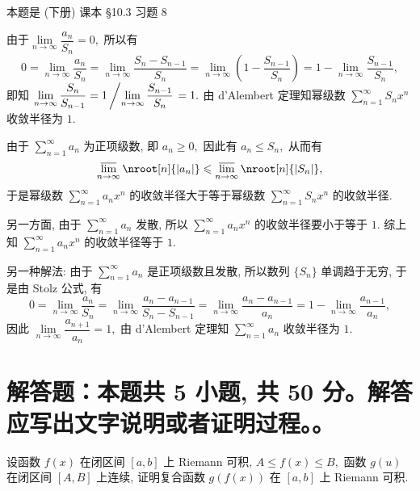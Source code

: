 \begin{solution}
本题是 (下册) 课本 \S 10.3 习题 8

由于$\lim\limits_{n\to\infty} \dfrac{a_n}{S_n} = 0,$ 所以有
\[0 = \lim\limits_{n\to\infty} \dfrac{a_n}{S_n} = \lim\limits_{n\to\infty} \dfrac{S_n - S_{n-1}}{S_n} = \lim\limits_{n\to\infty} \left( 1 - \dfrac{S_{n-1}}{S_n} \right) = 1 - \lim\limits_{n\to\infty} \dfrac{S_{n-1}}{S_n},\]
即知 $\lim\limits_{n\to\infty} \dfrac{S_n}{S_{n-1}} = 1 \left/ \lim\limits_{n\to\infty} \dfrac{S_{n-1}}{S_n} \right. = 1.$ 由 d'Alembert 定理知幂级数 $\sum\limits_{n=1}^{\infty} S_n x^n$ 收敛半径为 $1.$

由于 $\sum\limits_{n=1}^{\infty} a_n$ 为正项级数, 即 $a_n \geqslant 0,$ 因此有 $a_n \leqslant S_n,$ 从而有
\[\varlimsup_{n\to\infty} \nroot[n]{\lvert a_n \rvert} \leqslant \varlimsup_{n\to\infty} \nroot[n]{\lvert S_n \rvert},\]
于是幂级数 $\sum\limits_{n=1}^{\infty} a_n x^n$ 的收敛半径大于等于幂级数 $\sum\limits_{n=1}^{\infty} S_n x^n$ 的收敛半径.

另一方面, 由于 $\sum\limits_{n=1}^{\infty} a_n$ 发散, 所以 $\sum\limits_{n=1}^{\infty} a_n x^n$ 的收敛半径要小于等于 $1.$ 综上知 $\sum\limits_{n=1}^{\infty} a_n x^n$ 的收敛半径等于 $1.$

另一种解法: 由于 $\sum\limits_{n=1}^{\infty} a_n$ 是正项级数且发散, 所以数列 $\{S_n\}$ 单调趋于无穷, 于是由 Stolz 公式, 有
\[0 = \lim\limits_{n\to\infty} \dfrac{a_n}{S_n} = \lim\limits_{n\to\infty} \dfrac{a_n-a_{n-1}}{S_n-S_{n-1}} = \lim\limits_{n\to\infty} \dfrac{a_n-a_{n-1}}{a_n} = 1 -\lim\limits_{n\to\infty} \dfrac{a_{n-1}}{a_n},\]
因此 $\lim\limits_{n\to\infty} \dfrac{a_{n+1}}{a_n} = 1,$ 由 d'Alembert 定理知 $\sum\limits_{n=1}^{\infty} a_n$ 收敛半径为 $1.$
\end{solution}


\showquestionpoints
\section{解答题：本题共 5 小题, 共 50 分。解答应写出文字说明或者证明过程。。}


\begin{question}[points = 8]
设函数 $f(x)$ 在闭区间 $[a, b]$ 上 Riemann 可积, $A \leqslant f(x) \leqslant B,$ 函数 $g(u)$ 在闭区间 $[A, B]$ 上连续, 证明复合函数 $g(f(x))$ 在 $[a, b]$ 上 Riemann 可积.

\end{question}


